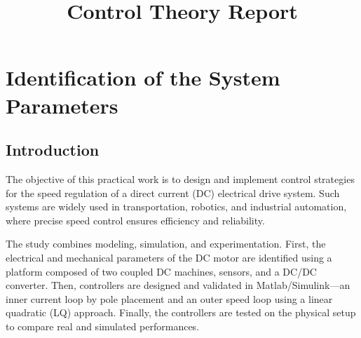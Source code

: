 \documentclass{rapportCS}
\title{Control Theory Report} %
\begin{document}






        
\fairemarges %
\fairepagedegarde %

\begin{center}
	\begin{abstract}
        \lipsum[1-2]
    \end{abstract}
\end{center}
\newpage


\tabledematieres %




\section{Identification of the System Parameters}

\subsection{Introduction}

The objective of this practical work is to design and implement control strategies for the speed regulation of a direct current (DC) electrical drive system. Such systems are widely used in transportation, robotics, and industrial automation, where precise speed control ensures efficiency and reliability.

The study combines modeling, simulation, and experimentation. First, the electrical and mechanical parameters of the DC motor are identified using a platform composed of two coupled DC machines, sensors, and a DC/DC converter. Then, controllers are designed and validated in Matlab/Simulink—an inner current loop by pole placement and an outer speed loop using a linear quadratic (LQ) approach. Finally, the controllers are tested on the physical setup to compare real and simulated performances.
\end{document}
